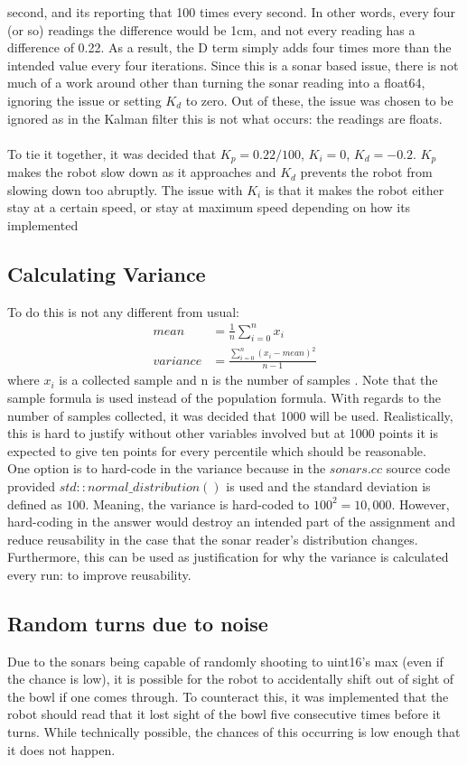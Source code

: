 \documentclass{article}
\newcommand\tab[1][1cm]{\hspace*{#1}}
\begin{document}
second, and its reporting that 100 times every second. In other words, every
four (or so) readings the difference would be 1cm, and not every reading has a
difference of 0.22. As a result, the D term simply adds four times more than the
intended value every four iterations. Since this is a sonar based issue, there
is not much of a work around other than turning the sonar reading into a
float64, ignoring the issue or setting $K_d$ to zero. Out of these, the issue was
chosen to be ignored as in the Kalman filter this is not what occurs: the
readings are floats.
\\ \\
To tie it together, it was decided that $K_p=0.22/100$, $K_i=0$, $K_d=-0.2$.
$K_p$ makes the robot slow down as it approaches and $K_d$ prevents the robot
from slowing down too abruptly. The issue with $K_i$ is that it makes the robot
either stay at a certain speed, or stay at maximum speed depending on how its
implemented 
\subsection{Calculating Variance}
To do this is not any different from usual:
\begin{equation}
    \begin{split}
        mean & = \frac{1}{n} \sum_{i=0}^n{x_i} \\
        variance & = \frac{\sum_{i=0}^n{(x_i - mean)^2}}{n-1}
    \end{split}
\end{equation}
where $x_i$ is a collected sample and n is the number of samples
\cite{variance}. Note that the sample formula is used instead of the population
formula. With regards to the number of samples collected, it was decided that
1000 will be used. Realistically, this is hard to justify without other
variables involved but at 1000 points it is expected to give ten points for
every percentile which should be reasonable.  
\\ \tab One option is to hard-code in the variance because in the $sonars.cc$ 
source code provided $std::normal\_distribution()$ is used and the standard
deviation is defined as $100$. Meaning, the variance is hard-coded to $100^2 =
10,000$. However, hard-coding in the answer would destroy an intended part of
the assignment and reduce reusability in the case that the sonar reader's
distribution changes. Furthermore, this can be used as justification for why the
variance is calculated every run: to improve reusability.
\subsection{Random turns due to noise}
Due to the sonars being capable of randomly shooting to uint16's max (even if
the chance is low), it is possible for the robot to accidentally shift out of
sight of the bowl if one comes through. To counteract this, it was implemented
that the robot should read that it lost sight of the bowl five consecutive times
before it turns. While technically possible, the chances of this occurring is low
enough that it does not happen. 
\newpage
\end{document}
